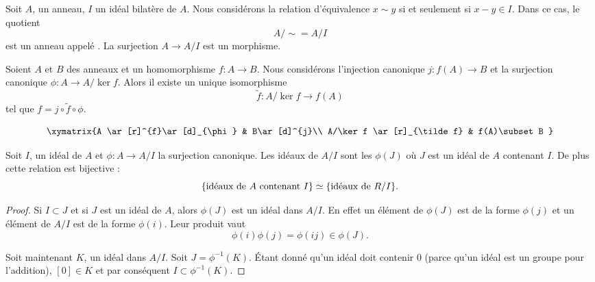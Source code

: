 Soit \( A\), un anneau, \( I\) un idéal bilatère de \( A\). Nous considérons la relation d'équivalence \( x\sim y\) si et seulement si \( x-y\in I\). Dans ce cas, le quotient
\begin{equation}
    A/\sim=A/I
\end{equation}
est un anneau appelé . La surjection \( A\to A/I\) est un morphisme.

\begin{proposition}
    Soient \( A\) et \( B\) des anneaux et un homomorphisme \( f\colon A\to B\). Nous considérons l'injection canonique \( j\colon f(A)\to B\) et la surjection canonique \( \phi\colon A\to A/\ker f\). Alors il existe un unique isomorphisme
    \begin{equation}
        \tilde f \colon A/\ker f\to f(A)
    \end{equation}
    tel que \( f=j\circ\tilde f\circ\phi\).

    \begin{equation}
        \xymatrix{%
        A \ar[r]^{f}\ar[d]_{\phi}        &   B\ar[d]^{j}\\
           A/\ker f \ar[r]_{\tilde f}   &   f(A)\subset B
           }
    \end{equation}
\end{proposition}

\begin{proposition}     \label{PropIJJIdsousphi}
    Soit \( I\), un idéal de \( A\) et \( \phi\colon A\to A/I\) la surjection canonique. Les idéaux de \( A/I\) sont les \( \phi(J)\) où \( J\) est un idéal de \( A\) contenant \( I\). De plus cette relation est bijective :
    \begin{equation}        \label{EqKbrizu}
        \{ \text{idéaux de \( A\) contenant \( I\)}\}\simeq\{ \text{idéaux de \( R/I\)} \}.
    \end{equation}
\end{proposition}

\begin{proof}
    Si \( I\subset J\) et si \( J \) est un idéal de \( A\), alors \( \phi(J)\) est un idéal dans \( A/I\). En effet un élément de \( \phi(J)\) est de la forme \( \phi(j)\) et un élément de \( A/I\) est de la forme \( \phi(i)\). Leur produit vaut
    \begin{equation}
        \phi(i)\phi(j)=\phi(ij)\in\phi(J).
    \end{equation}
    
    Soit maintenant \( K\), un idéal dans \( A/I\). Soit \( J=\phi^{-1}(K)\). Étant donné qu'un idéal doit contenir \( 0\) (parce qu'un idéal est un groupe pour l'addition), \( [0]\in K\) et par conséquent \( I\subset\phi^{-1}(K)\).
\end{proof}

